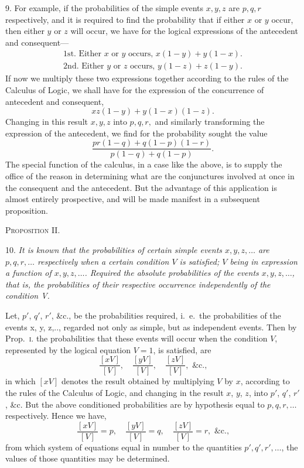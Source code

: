 \documentclass[oneside]{book}
\begin{document}
9. For example, if the probabilities of the simple events
$x, y, z$ are $p, q, r$ respectively, and it is required to find the
probability that if either $x$ or $y$ occur, then either $y$ or $z$ will occur,
we have for the logical expressions of the antecedent and consequent---
\begin{gather*}
  \text{1st. Either $x$ or $y$ occurs, }x(1-y) + y(1-x).  \\
  \text{2nd. Either $y$ or $z$ occurs, }y(1-z) + z(1-y).
\end{gather*}
If now we multiply these two expressions together according to
the rules of the Calculus of Logic, we shall have for the expression of
the concurrence of antecedent and consequent,
\[
  xz(1-y) + y(1-x)(1-z).
\]
Changing in this result $x, y, z$ into $p, q, r,$ and similarly transforming
the expression of the antecedent, we find for the probability sought the value
\[
  \frac{pr(1-q) + q(1-p)(1-r)}{p(1-q) + q(1-p)}.
\]
The special function of the calculus, in a case like the above, is
to supply the office of the reason in determining what are the
conjunctures involved at once in the consequent and the antecedent. But the
advantage of this application is almost entirely
prospective, and will be made manifest in a subsequent proposition.


\begin{center}\textsc{Proposition II.}\end{center}

10. \emph{It is known that the probabilities of certain simple events
$x, y, z, \dotsc$ are $p, q, r, \dotsc$ respectively when a certain condition $V$ is
satisfied; $V$ being in expression a function of $x, y, z, \dotsc$. Required
the absolute probabilities of the events $x, y, z, \dotsc$, that is, the
probabilities of their respective occurrence independently of the condition V.}

Let, $p'$, $q'$, $r'$, \&c., be the probabilities required, i.~e.\ the probabilities of the events x, y, z,.., regarded not only as simple,
but as independent events. Then by Prop.~\textsc{i.} the probabilities
that these events will occur when the condition $V$, represented
by the logical equation $V=1$, is satisfied, are
\[
  \frac{\left[ xV \right]}{\left[ V \right]},\quad
  \frac{\left[ yV \right]}{\left[ V \right]},\quad
  \frac{\left[ zV \right]}{\left[ V \right]},\text{ \&c.,}
\]
in which $\left[ xV \right]$ denotes the result obtained by multiplying $V$ by
$x$, according to the rules of the Calculus of Logic, and changing
in the result $x$, $y$, $z$, into $p'$, $q'$, $r'$, \&c. But the above conditioned probabilities are by hypothesis equal to $p, q, r,\dotsc$ respectively. Hence we have,
\[
  \frac{\left[ xV \right]}{\left[ V \right]} = p,\quad
  \frac{\left[ yV \right]}{\left[ V \right]} = q,\quad
  \frac{\left[ zV \right]}{\left[ V \right]} = r,\text{ \&c.,}
\]
from which system of equations equal in number to the quantities
$p', q', r',\dotsc$, the values of those quantities may be determined.
\end{document}
